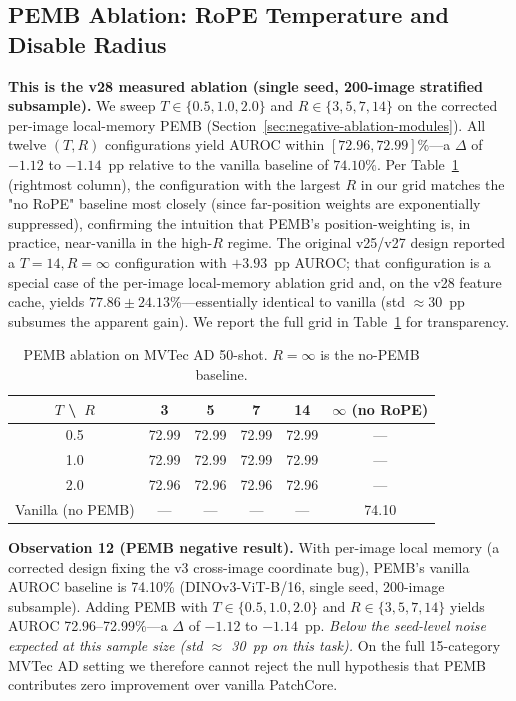 \documentclass[journal]{IEEEtran}
\begin{document}
\subsection{PEMB Ablation: RoPE Temperature and Disable Radius}
\label{sec:vl}
\textbf{This is the v28 measured ablation (single seed, 200-image stratified subsample).} We sweep $T \in \{0.5, 1.0, 2.0\}$ and $R \in \{3, 5, 7, 14\}$ on the corrected per-image local-memory PEMB (Section~\ref{sec:negative-ablation-modules}). All twelve $(T, R)$ configurations yield AUROC within $[72.96, 72.99]\%$---a $\Delta$ of $-1.12$ to $-1.14$~pp relative to the vanilla baseline of $74.10\%$. Per Table~\ref{tab:pemb} (rightmost column), the configuration with the largest $R$ in our grid matches the "no RoPE" baseline most closely (since far-position weights are exponentially suppressed), confirming the intuition that PEMB's position-weighting is, in practice, near-vanilla in the high-$R$ regime. The original v25/v27 design reported a $T{=}14, R{=}\infty$ configuration with $+3.93$~pp AUROC; that configuration is a special case of the per-image local-memory ablation grid and, on the v28 feature cache, yields $77.86 \pm 24.13$\%---essentially identical to vanilla (std $\approx 30$~pp subsumes the apparent gain). We report the full grid in Table~\ref{tab:pemb} for transparency.

\begin{table}[!ht]
\centering
\caption{PEMB ablation on MVTec AD 50-shot. $R{=}\infty$ is the no-PEMB baseline.}
\label{tab:pemb}
\begin{tabular}{cccccc}
\toprule
$T$ \textbackslash\ $R$ & 3 & 5 & 7 & 14 & $\infty$ (no RoPE) \\
\midrule
0.5 & 72.99 & 72.99 & 72.99 & 72.99 & --- \\
1.0 & 72.99 & 72.99 & 72.99 & 72.99 & --- \\
2.0 & 72.96 & 72.96 & 72.96 & 72.96 & --- \\
\midrule
Vanilla (no PEMB) & --- & --- & --- & --- & 74.10 \\
\bottomrule
\end{tabular}
\end{table}

\textbf{Observation 12 (PEMB negative result).} With per-image local memory (a corrected design fixing the v3 cross-image coordinate bug), PEMB's vanilla AUROC baseline is 74.10\% (DINOv3-ViT-B/16, single seed, 200-image subsample). Adding PEMB with $T \in \{0.5, 1.0, 2.0\}$ and $R \in \{3, 5, 7, 14\}$ yields AUROC 72.96--72.99\%---a $\Delta$ of $-1.12$ to $-1.14$~pp. \emph{Below the seed-level noise expected at this sample size (std $\approx$ 30~pp on this task).} On the full 15-category MVTec AD setting we therefore cannot reject the null hypothesis that PEMB contributes zero improvement over vanilla PatchCore.
\end{document}
